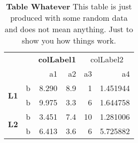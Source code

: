 \begin{table}[ht]
\centering
\caption{\textbf{Table Whatever} This table is just produced with some random data and does not mean anything. Just to show you how things work.} 
\label{testTable}
\begingroup\footnotesize
\begin{tabular}{llrr|rr}
  \toprule 
 \multicolumn{2}{c}{} & \multicolumn{2}{c}{\textbf{colLabel1}} & \multicolumn{2}{c}{colLabel2} \\
 \cmidrule(l){3-4} \cmidrule(l){5-6}
  & & a1 & a2 & a3 & a4 \\
 \midrule 
 \midrule\multirow{2}{*}{\textbf{L1}} & b & 8.290 & 8.9 & 1 & 1.451944 \\ 
   & b & 9.975 & 3.3 & 6 & 1.644758 \\ 
   \cmidrule(l){3-4} \cmidrule(l){5-6}
\midrule\multirow{2}{*}{\textbf{L2}} & b & 3.451 & 7.4 & 10 & 1.281006 \\ 
   & b & 6.413 & 3.6 & 6 & 5.725882 \\ 
   \bottomrule 
\end{tabular}
\endgroup
\end{table}
